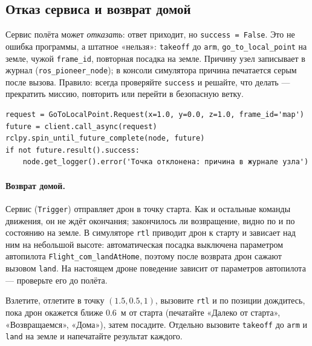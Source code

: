 \subsection{Отказ сервиса и возврат домой}

Сервис полёта может \emph{отказать}: ответ приходит, но \verb|success = False|. Это не ошибка программы, а штатное «нельзя»: \verb|takeoff| до \verb|arm|, \verb|go_to_local_point| на земле, чужой \verb|frame_id|, повторная посадка на земле. Причину узел записывает в журнал (\verb|ros_pioneer_node|); в консоли симулятора причина печатается серым после вызова. Правило: всегда проверяйте \verb|success| и решайте, что делать --- прекратить миссию, повторить или перейти в безопасную ветку.

\begin{codebox}
\small
\begin{verbatim}
request = GoToLocalPoint.Request(x=1.0, y=0.0, z=1.0, frame_id='map')
future = client.call_async(request)
rclpy.spin_until_future_complete(node, future)
if not future.result().success:
    node.get_logger().error('Точка отклонена: причина в журнале узла')
\end{verbatim}
\end{codebox}

\paragraph{Возврат домой.} Сервис  (\verb|Trigger|) отправляет дрон в точку старта. Как и остальные команды движения, он не ждёт окончания; закончилось ли возвращение, видно по  и по состоянию на земле. В симуляторе \verb|rtl| приводит дрон к старту и зависает над ним на небольшой высоте: автоматическая посадка выключена параметром автопилота \texttt{Flight\_com\_landAtHome}, поэтому после возврата дрон сажают вызовом \verb|land|. На настоящем дроне поведение зависит от параметров автопилота --- проверьте его до полёта.

\begin{taskbox}
Взлетите, отлетите в точку $(1.5, 0.5, 1)$, вызовите \verb|rtl| и по позиции дождитесь, пока дрон окажется ближе 0.6~м от старта (печатайте «Далеко от старта», «Возвращаемся», «Дома»), затем посадите. Отдельно вызовите \verb|takeoff| до \verb|arm| и \verb|land| на земле и напечатайте результат каждого.
\end{taskbox}
